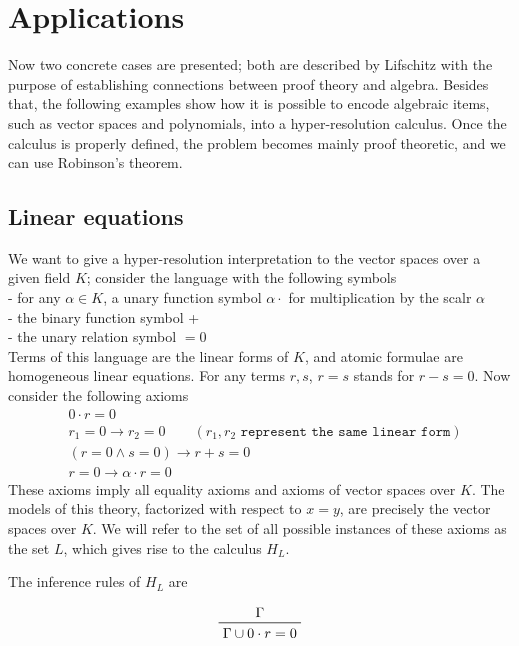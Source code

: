 \documentclass[a4paper,12pt,oneside]{book}
\let\e\wedge
\begin{document}
\section{Applications}
Now two concrete cases are presented; both are described by Lifschitz \cite{lifschitz} with the purpose of establishing connections between proof theory and algebra. Besides that, the following examples show how it is possible to encode algebraic items, such as vector spaces and polynomials, into a hyper-resolution calculus. Once the calculus is properly defined, the problem becomes mainly proof theoretic, and we can use Robinson's theorem.


\subsection*{Linear equations}
 
We want to give a hyper-resolution interpretation to the vector spaces over a given field $K$; consider the language with the following symbols\\
- for any $\alpha\in K$, a unary function symbol $\alpha\cdot$ for multiplication by the scalr $\alpha$\\
-  the binary function symbol +\\
- the unary relation symbol $=0$\\
Terms of this language are the linear forms of $K$, and atomic formulae are \\homogeneous linear equations. For any terms $r,s$, $r=s$ stands for $r-s=0$. Now consider the following axioms
\begin{eqnarray}
&0\cdot r =0 \\
&r_1=0\rightarrow r_2 =0  \qquad (r_1,r_2 \texttt{ represent the same linear form}) \\
& ( r=0 \e s=0 )\rightarrow r+s =0 \\
& r=0 \rightarrow \alpha\cdot r =0
\end{eqnarray}
These axioms imply all equality axioms and axioms of vector spaces over $K$. The models of this theory, factorized with respect to $x=y$, are precisely the vector spaces over $K$.
We will refer to the set of all possible instances of these axioms as the set $L$, which gives rise to the calculus $H_L$. 

\noindent The inference rules of $H_L$ are

\begin{equation} \label{rule1}
\prftree{\Gamma}{\Gamma\cup 0\cdot r=0 }
\end{equation}
\end{document}
